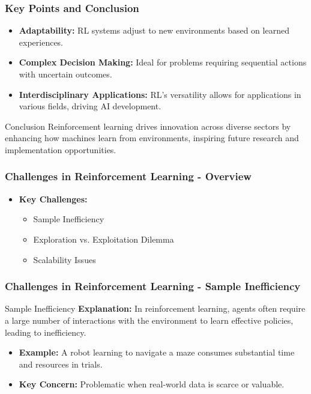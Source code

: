 \documentclass[aspectratio=169]{beamer}
\begin{document}
\begin{frame}[fragile]
    \frametitle{Key Points and Conclusion}
    \begin{itemize}
        \item \textbf{Adaptability:} RL systems adjust to new environments based on learned experiences.
        \item \textbf{Complex Decision Making:} Ideal for problems requiring sequential actions with uncertain outcomes.
        \item \textbf{Interdisciplinary Applications:} RL's versatility allows for applications in various fields, driving AI development.
    \end{itemize}
    \begin{block}{Conclusion}
        Reinforcement learning drives innovation across diverse sectors by enhancing how machines learn from environments, inspiring future research and implementation opportunities.
    \end{block}
\end{frame}

\begin{frame}[fragile]
    \frametitle{Challenges in Reinforcement Learning - Overview}
    \begin{itemize}
        \item \textbf{Key Challenges:}
        \begin{itemize}
            \item Sample Inefficiency
            \item Exploration vs. Exploitation Dilemma
            \item Scalability Issues
        \end{itemize}
    \end{itemize}
\end{frame}

\begin{frame}[fragile]
    \frametitle{Challenges in Reinforcement Learning - Sample Inefficiency}
    \begin{block}{Sample Inefficiency}
        \textbf{Explanation:} In reinforcement learning, agents often require a large number of interactions with the environment to learn effective policies, leading to inefficiency.
    \end{block}
    \begin{itemize}
        \item \textbf{Example:} A robot learning to navigate a maze consumes substantial time and resources in trials.
        \item \textbf{Key Concern:} Problematic when real-world data is scarce or valuable.
    \end{itemize}
\end{frame}
\end{document}
